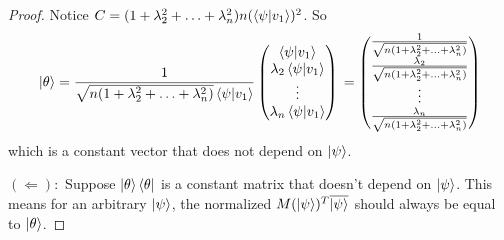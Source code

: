 \begin{proof}
Notice $C=(1+\lambda_2^2+\hdots+\lambda_n^2)n(\braket{\psi|v_1})^2$. So\\
\begin{equation}
\ket{\theta}=\frac{1}{\sqrt{n(1+\lambda_2^2+\hdots+\lambda_n^2)}\braket{\psi|v_1}}
\begin{pmatrix}
\braket{\psi|v_1}\\
\lambda_2 \braket{\psi|v_1}\\
\vdots\\
\lambda_n \braket{\psi|v_1}
\end{pmatrix}\\
=\begin{pmatrix}
\frac{1}{\sqrt{n(1+\lambda_2^2+\hdots+\lambda_n^2)}}\\
\frac{\lambda_2}{\sqrt{n(1+\lambda_2^2+\hdots+\lambda_n^2)}}\\
\vdots\\
\frac{\lambda_n}{\sqrt{n(1+\lambda_2^2+\hdots+\lambda_n^2)}}
\end{pmatrix} 
\end{equation}
which is a constant vector that does not depend on $\ket{\psi}$.

\bigskip
$(\Leftarrow):$ Suppose $\ket{\theta}\bra{\theta}$ is a constant matrix that doesn't depend on $\ket{\psi}$. This means for an arbitrary $\ket{\psi}$, the normalized $M(\ket{\psi})^T \overline{\ket{\psi}}$ should always be equal to $\ket{\theta}$.


\end{proof}
